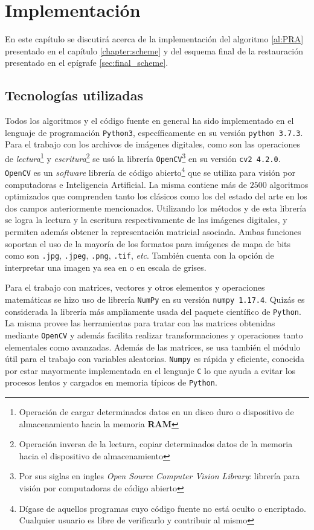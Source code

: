 \chapter{Implementaci\'on}\label{chapter:code}

En este capítulo se discutirá acerca de la implementación del algoritmo \ref{al:PRA} presentado en el capítulo \ref{chapter:scheme} y del esquema final de la restauraci\'on presentado en el epígrafe \ref{sec:final_scheme}.

\section{Tecnolog\'ias utilizadas}
Todos los algoritmos y el c\'odigo fuente en general ha sido implementado en el lenguaje de programaci\'on \texttt{Python3}, específicamente en su versi\'on \texttt{python 3.7.3}. Para el trabajo con los archivos de im\'agenes digitales, como son las operaciones de \textit{lectura}\footnote{Operaci\'on de cargar determinados datos en un disco duro o dispositivo de almacenamiento hacia la memoria \textbf{RAM}} y \textit{escritura}\footnote{Operaci\'on inversa de la lectura, copiar determinados datos de la memoria hacia el dispositivo de almacenamiento} se us\'o la librer\'ia \texttt{OpenCV}\footnote{Por sus siglas en ingles \textit{Open Source Computer Vision Library}: librer\'ia para visi\'on por computadoras de c\'odigo abierto} en su versi\'on \texttt{cv2 4.2.0}. \texttt{OpenCV} es un \textit{software} librer\'ia de c\'odigo abierto\footnote{D\'igase de aquellos programas cuyo c\'odigo fuente no est\'a oculto o encriptado. Cualquier usuario es libre de verificarlo y contribuir al mismo} que se utiliza para visi\'on por computadoras e Inteligencia Artificial. La misma contiene m\'as de $2500$ algoritmos optimizados que comprenden tanto los cl\'asicos como los del estado del arte en los dos campos anteriormente mencionados. Utilizando los m\'etodos  y  de esta librer\'ia se logra la lectura y la escritura respectivamente de las im\'agenes digitales, y permiten adem\'as obtener la representaci\'on matricial asociada. Ambas funciones soportan el uso de la mayor\'ia de los formatos para imágenes de mapa de bits como son \texttt{.jpg}, \texttt{.jpeg}, \texttt{.png}, \texttt{.tif}, \textit{etc}. Tambi\'en cuenta con la opción de interpretar una imagen ya sea en \RGB o en escala de grises.

Para el trabajo con matrices, vectores y otros elementos y operaciones matem\'aticas se hizo uso de librer\'ia \texttt{NumPy} en su versi\'on \texttt{numpy 1.17.4}. Quizás es considerada la librer\'ia m\'as ampliamente usada del paquete científico de \texttt{Python}. La misma provee las herramientas para tratar con las matrices obtenidas mediante \texttt{OpenCV} y adem\'as facilita realizar transformaciones y operaciones tanto elementales como avanzadas. Adem\'as de las matrices, se usa tambi\'en el m\'odulo  \'util para el trabajo con variables aleatorias. \texttt{Numpy} es r\'apida y eficiente, conocida por estar mayormente implementada en el lenguaje \texttt{C} lo que ayuda a evitar los procesos lentos y cargados en memoria t\'ipicos de \texttt{Python}.

